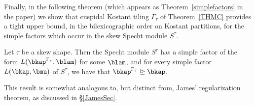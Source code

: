 Finally, in the following theorem (which appears as Theorem~\ref{simplefactors} in the paper) we show that cuspidal Kostant tiling \(\Gamma_\tau\) of Theorem~\ref{THMC} provides a tight upper bound, in the bilexicographic order on Kostant partitions, for the simple factors which occur in the skew Specht module \(S^\tau\). 

\begin{introtheorem}
Let \(\tau\) be a skew shape. Then the Specht module \(S^\tau\) has a simple factor of the form \(L(\bkap^{\Gamma_\tau}, \blam)\) for some \(\blam\), and for every simple factor \(L(\bkap, \bmu)\) of \(S^\tau\), we have that \(\bkap^{\Gamma_\tau} \trianglerighteq \bkap\).
\end{introtheorem}

This result is somewhat analogous to, but distinct from, James' regularization theorem, as discussed in \S\ref{JamesSec}.

